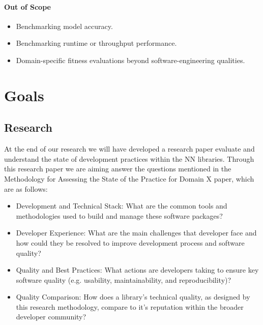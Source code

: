 \documentclass{article}
\begin{document}
\begin{itemize}
\paragraph{Out of Scope}
\begin{itemize}
  \item Benchmarking model accuracy.
  \item Benchmarking runtime or throughput performance.
  \item Domain-specific fitness evaluations beyond software-engineering qualities.
\end{itemize}


\section{Goals}
\subsection{Research}
At the end of our research we will have developed a research paper evaluate and understand the state of development practices within the NN libraries. Through this research paper we are aiming answer the questions mentioned in the Methodology for Assessing the State of the Practice for Domain X paper, which are as follows:
\begin{itemize}
    \item Development and Technical Stack: What are the common tools and methodologies used to build and manage these software packages?
    \item Developer Experience: What are the main challenges that developer face and how could they be resolved to improve development process and software quality?
    \item Quality and Best Practices: What actions are developers taking to ensure key software quality (e.g. usability, maintainability, and reproducibility)?
    \item Quality Comparison: How does a library's technical quality, as designed by this research methodology, compare to it's reputation within the broader developer community?
\end{itemize}

\end{itemize}
\end{document}
